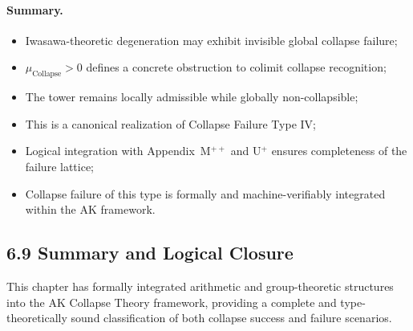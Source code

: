 \documentclass[11pt]{article}
\begin{document}
\paragraph{Summary.}
\begin{itemize}
  \item Iwasawa-theoretic degeneration may exhibit invisible global collapse failure;
  \item $\mu_{\mathrm{Collapse}} > 0$ defines a concrete obstruction to colimit collapse recognition;
  \item The tower remains locally admissible while globally non-collapsible;
  \item This is a canonical realization of Collapse Failure Type IV;
  \item Logical integration with Appendix~M$^{++}$ and U$^+$ ensures completeness of the failure lattice;
  \item Collapse failure of this type is formally and machine-verifiably integrated within the AK framework.
\end{itemize}


\subsection*{6.9 Summary and Logical Closure}

This chapter has formally integrated arithmetic and group-theoretic structures into the AK Collapse Theory framework, providing a complete and type-theoretically sound classification of both collapse success and failure scenarios.
\end{document}
